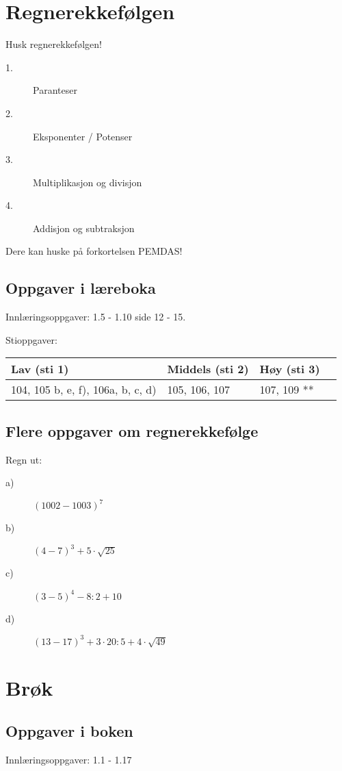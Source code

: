 \documentclass[a4, 11pt, twoside]{article}
\theoremstyle{definition}
\begin{document}
\section{Regnerekkefølgen}
Husk regnerekkefølgen!
\begin{description}
\item[1.] Paranteser
\item[2.] Eksponenter / Potenser
\item[3.] Multiplikasjon og divisjon
\item[4.] Addisjon og subtraksjon
\end{description}
Dere kan huske på forkortelsen PEMDAS!
\subsection{Oppgaver i læreboka}
Innlæringsoppgaver: 1.5 - 1.10 side 12 - 15.

Stioppgaver:
\begin{center}
\begin{tabular}{| l | l | l | l |}
\hline
\textbf{Lav (sti 1)}                & \textbf{Middels (sti 2)}            &       \textbf{Høy (sti 3)}      \\ \hline
104, 105 b, e, f), 106a, b, c, d)   & 105, 106, 107                       &         107, 109 **                \\ \hline
\end{tabular}
\end{center}

\subsection{Flere oppgaver om regnerekkefølge}

\begin{Exercise}
Regn ut:
\begin{description}
\item[a)] $(1002 - 1003)^{7}$
\item[b)] $(4 - 7)^3 + 5\cdot\sqrt{25}$
\item[c)] $(3 - 5)^4 - 8:2 + 10$
\item[d)] $(13 - 17)^3 + 3\cdot 20:5 + 4\cdot\sqrt{49}$
\end{description}
\end{Exercise}


\section{Brøk}
\subsection{Oppgaver i boken}
Innlæringsoppgaver: 1.1 - 1.17
\end{document}
